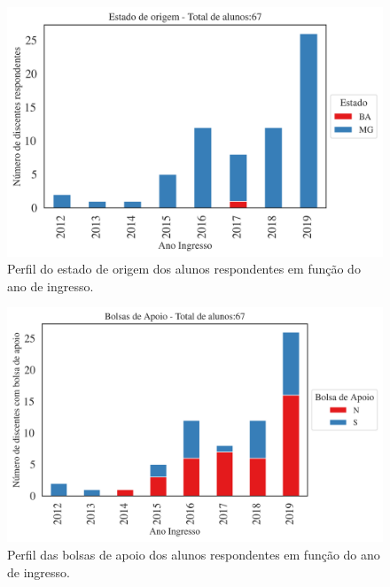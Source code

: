 \documentclass[a4paper,10pt]{article}
\begin{document}
\begin{figure}[h]
\centering
\includegraphics[width=0.85\linewidth]{quantitativos_estado_de_origem_1178684.png}
\caption{\label{fig:estado_ano} Perfil do estado de origem dos alunos respondentes em função do ano de ingresso.}
\end{figure}

\begin{figure}[h]
\centering
\includegraphics[width=0.85\linewidth]{quantitativos_bolsa_de_apoio_1178684.png}
\caption{\label{fig:bolsa_ano} Perfil das bolsas de apoio  dos alunos respondentes em função do ano de ingresso.}
\end{figure}
\end{document}
